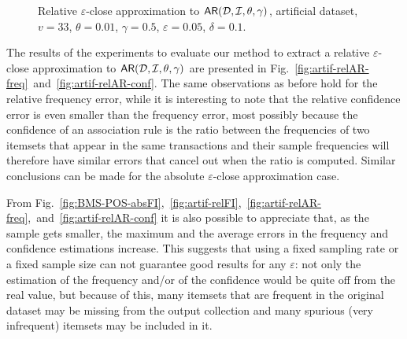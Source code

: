 \begin{figure}[tp]
  \centering
  \hfill
  \caption{ Relative $\varepsilon$-close approximation to
  $\mathsf{AR}({\cal D},{\cal I},\theta,\gamma)$, artificial dataset, $v=33$, $\theta=0.01$,
  $\gamma=0.5$, $\varepsilon=0.05$, $\delta=0.1$.}
  \label{fig:ar}
\end{figure}

The results of the experiments to evaluate our method to extract a relative
$\varepsilon$-close approximation to $\mathsf{AR}({\cal D},{\cal I},\theta,\gamma)$ are presented
in Fig.~\ref{fig:artif-relAR-freq}~and~\ref{fig:artif-relAR-conf}. The same
observations as before hold for the relative
frequency error, while it is interesting to note that the relative confidence
error is even smaller than the frequency error, most possibly because the
confidence of an association rule is the ratio between the frequencies of two
itemsets that appear in the same transactions and their sample frequencies will
therefore have similar errors that cancel out when the ratio is computed.
Similar conclusions can be made for the absolute $\varepsilon$-close
approximation case.

From
Fig.~\ref{fig:BMS-POS-absFI},~\ref{fig:artif-relFI},~\ref{fig:artif-relAR-freq},~and~\ref{fig:artif-relAR-conf}
it is also possible to appreciate that, as the sample gets smaller, the maximum
and the average errors in the frequency and confidence estimations increase.
This suggests that using a fixed sampling rate or a fixed sample size can not
guarantee good results for any $\varepsilon$: not only the estimation of the
frequency and/or of the confidence would be quite off from the real value, but
because of this, many itemsets that are frequent in the original dataset may be
missing from the output collection and many spurious (very infrequent) itemsets
may be included in it.

